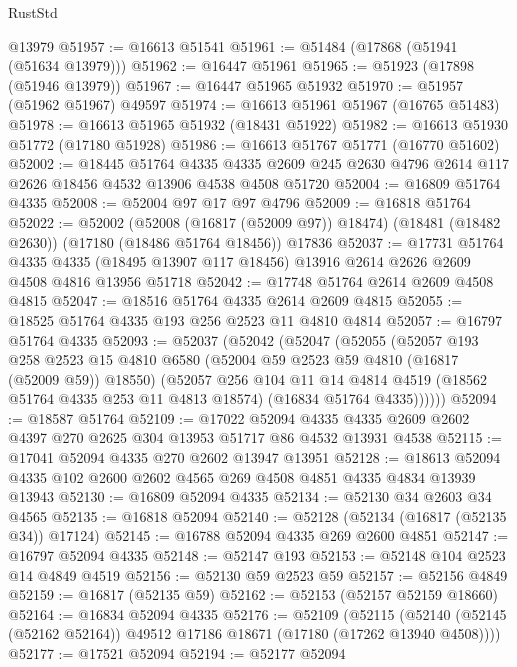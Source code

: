 \begin{lexlean}{RustStd}
\begin{coremodule}
{\begin{coremodule}
{{{{{{{{{{{{{{{{{{{{{{{{{{{{{{{{{{{{{{{{{{{{{{{{{{{{{{{    @13979
@51957 := @16613 @51541
@51961 := @51484 (@17868 (@51941 (@51634 @13979)))
@51962 := @16447 @51961
@51965 := @51923 (@17898 (@51946 @13979))
@51967 := @16447 @51965 @51932
@51970 := @51957 (@51962 @51967) @49597
@51974 := @16613 @51961 @51967 (@16765 @51483)
@51978 := @16613 @51965 @51932 (@18431 @51922)
@51982 := @16613 @51930 @51772 (@17180 @51928)
@51986 := @16613 @51767 @51771 (@16770 @51602)
@52002 := @18445
    @51764
    @4335
    @4335
    @2609
    @245
    @2630
    @4796
    @2614
    @117
    @2626
    @18456
    @4532
    @13906
    @4538
    @4508
    @51720
@52004 := @16809 @51764 @4335
@52008 := @52004 @97 @17 @97 @4796
@52009 := @16818 @51764
@52022 := @52002
    (@52008 (@16817 (@52009 @97)) @18474)
    (@18481 (@18482 @2630))
    (@17180 (@18486 @51764 @18456))
    @17836
@52037 := @17731
    @51764
    @4335
    @4335
    (@18495 @13907 @117 @18456)
    @13916
    @2614
    @2626
    @2609
    @4508
    @4816
    @13956
    @51718
@52042 := @17748 @51764 @2614 @2609 @4508 @4815
@52047 := @18516 @51764 @4335 @2614 @2609 @4815
@52055 := @18525 @51764 @4335 @193 @256 @2523 @11 @4810 @4814
@52057 := @16797 @51764 @4335
@52093 := @52037
    (@52042
      (@52047
        (@52055
          (@52057
            @193
            @258
            @2523
            @15
            @4810
            @6580
            (@52004 @59 @2523 @59 @4810 (@16817 (@52009 @59)) @18550)
            (@52057
              @256
              @104
              @11
              @14
              @4814
              @4519
              (@18562 @51764 @4335 @253 @11 @4813 @18574)
              (@16834 @51764 @4335))))))
@52094 := @18587 @51764
@52109 := @17022
    @52094
    @4335
    @4335
    @2609
    @2602
    @4397
    @270
    @2625
    @304
    @13953
    @51717
    @86
    @4532
    @13931
    @4538
@52115 := @17041 @52094 @4335 @270 @2602 @13947 @13951
@52128 := @18613 @52094 @4335 @102 @2600 @2602 @4565 @269 @4508 @4851 @4335 @4834 @13939 @13943
@52130 := @16809 @52094 @4335
@52134 := @52130 @34 @2603 @34 @4565
@52135 := @16818 @52094
@52140 := @52128 (@52134 (@16817 (@52135 @34)) @17124)
@52145 := @16788 @52094 @4335 @269 @2600 @4851
@52147 := @16797 @52094 @4335
@52148 := @52147 @193
@52153 := @52148 @104 @2523 @14 @4849 @4519
@52156 := @52130 @59 @2523 @59
@52157 := @52156 @4849
@52159 := @16817 (@52135 @59)
@52162 := @52153 (@52157 @52159 @18660)
@52164 := @16834 @52094 @4335
@52176 := @52109
    (@52115 (@52140 (@52145 (@52162 @52164)) @49512 @17186 @18671 (@17180 (@17262 @13940 @4508))))
@52177 := @17521 @52094
@52194 := @52177
    @52094
}}}}}}}}}}}}}}}}}}}}}}}}}}}}}}}}}}}}}}}}}}}}}}}}}}}}}}}
\end{coremodule}}
\end{coremodule}
\end{lexlean}
